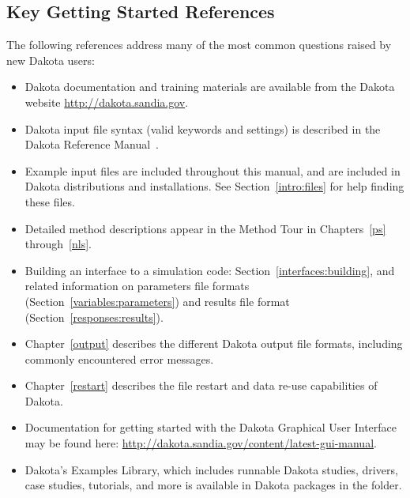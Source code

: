  
\subsection{Key Getting Started References}\label{tutorial:keyrefs}

The following references address many of the most common questions
raised by new Dakota users:
\begin{itemize}
\item Dakota documentation and training materials are available from
  the Dakota website \url{http://dakota.sandia.gov}.

\item Dakota input file syntax (valid keywords and settings) is
  described in the Dakota Reference Manual~\cite{RefMan}.

\item Example input files are included throughout this manual, and
  are included in Dakota distributions and installations. See
  Section~\ref{intro:files} for help finding these files.

\item Detailed method descriptions appear in the Method Tour in
  Chapters~\ref{ps} through~\ref{nls}.

\item Building an interface to a simulation code:
  Section~\ref{interfaces:building}, and related information on parameters
  file formats (Section~\ref{variables:parameters}) and results file
  format (Section~\ref{responses:results}).

\item Chapter~\ref{output} describes the different Dakota output file
  formats, including commonly encountered error messages.

\item Chapter~\ref{restart} describes the file restart and data re-use
  capabilities of Dakota.

\item Documentation for getting started with the Dakota Graphical
User Interface  may be found here:  
\url{http://dakota.sandia.gov/content/latest-gui-manual}.

\item Dakota's Examples Library, which includes runnable Dakota studies,
  drivers, case studies, tutorials, and more is available in Dakota
  packages in the  folder.

\end{itemize}
